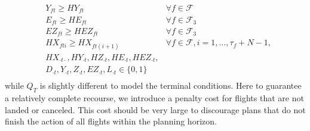 \documentclass[12pt]{article}
\begin{document}
\begin{subequations}
\begin{align}
		& Y_{ft} \geq HY_{ft} & \forall f \in \mathcal{F} \label{cons:transYt}\\
		& E_{ft} \geq HE_{ft} & \forall f \in \mathcal{F}_3 \label{cons:transEt}\\
		& EZ_{ft} \geq HEZ_{ft} & \forall f \in \mathcal{F}_3 \label{cons:transEZt}\\
		& HX_{fti} \geq HX_{ft(i+1)} & \forall f \in \mathcal{F}, i = 1, \dots, \tau_{f} + N -1, \label{cons:transHXt}\\
		& HX_{\cdot t \cdot}, HY_{\cdot t}, HZ_{\cdot t}, HE_{\cdot t}, HEZ_{\cdot t},& \nonumber\\ 
		&D_{\cdot t}, Y_{\cdot t}, Z_{\cdot t}, EZ_{\cdot t}, L_{\cdot t} \in \{0,1\}& \label{cons:binaryt}\\
		\end{align}
	\end{subequations}
	while \(Q_T\) is slightly different to model the terminal conditions. Here to guarantee a relatively complete recourse, we introduce a penalty cost for flights that are not landed or canceled. This cost should be very large to discourage plans that do not finish the action of all flights within the planning horizon.
\end{document}
